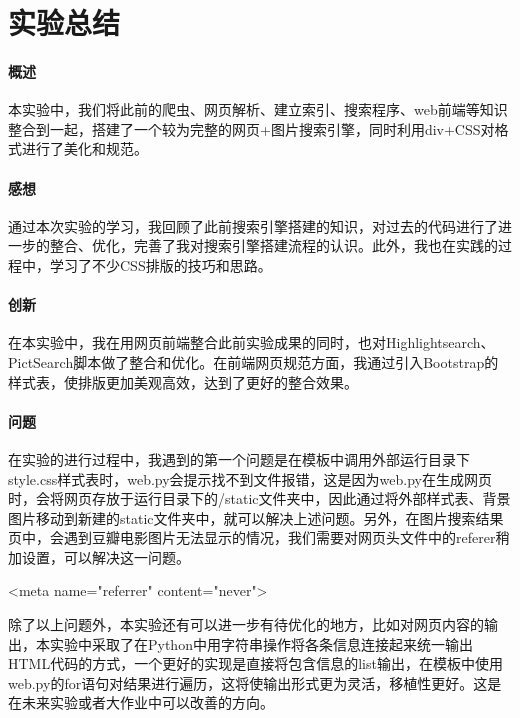 \documentclass{article}
\begin{document}
\section{实验总结}
\paragraph{概述}
本实验中，我们将此前的爬虫、网页解析、建立索引、搜索程序、web前端等知识整合到一起，搭建了一个较为完整的网页+图片搜索引擎，同时利用div+CSS对格式进行了美化和规范。

\paragraph{感想}
通过本次实验的学习，我回顾了此前搜索引擎搭建的知识，对过去的代码进行了进一步的整合、优化，完善了我对搜索引擎搭建流程的认识。此外，我也在实践的过程中，学习了不少CSS排版的技巧和思路。

\paragraph{创新}
在本实验中，我在用网页前端整合此前实验成果的同时，也对Highlightsearch、PictSearch脚本做了整合和优化。在前端网页规范方面，我通过引入Bootstrap的样式表，使排版更加美观高效，达到了更好的整合效果。

\paragraph{问题}

在实验的进行过程中，我遇到的第一个问题是在模板中调用外部运行目录下style.css样式表时，web.py会提示找不到文件报错，这是因为web.py在生成网页时，会将网页存放于运行目录下的/static文件夹中，因此通过将外部样式表、背景图片移动到新建的static文件夹中，就可以解决上述问题。另外，在图片搜索结果页中，会遇到豆瓣电影图片无法显示的情况，我们需要对网页头文件中的referer稍加设置，可以解决这一问题。
\begin{python}
<meta name="referrer" content="never">
\end{python}

除了以上问题外，本实验还有可以进一步有待优化的地方，比如对网页内容的输出，本实验中采取了在Python中用字符串操作将各条信息连接起来统一输出HTML代码的方式，一个更好的实现是直接将包含信息的list输出，在模板中使用web.py的for语句对结果进行遍历，这将使输出形式更为灵活，移植性更好。这是在未来实验或者大作业中可以改善的方向。
\end{document}

